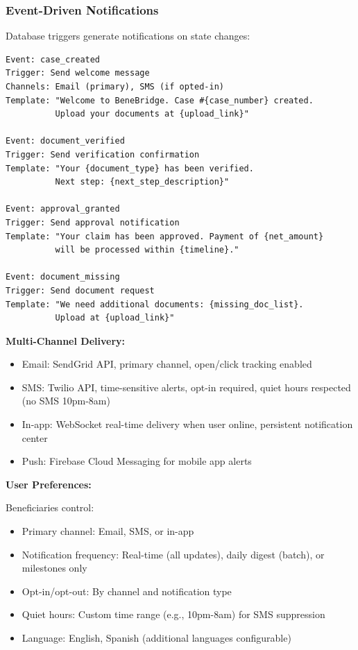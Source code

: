 \subsubsection{Event-Driven Notifications}

Database triggers generate notifications on state changes:

\begin{verbatim}
Event: case_created
Trigger: Send welcome message
Channels: Email (primary), SMS (if opted-in)
Template: "Welcome to BeneBridge. Case #{case_number} created.
          Upload your documents at {upload_link}"

Event: document_verified
Trigger: Send verification confirmation
Template: "Your {document_type} has been verified.
          Next step: {next_step_description}"

Event: approval_granted
Trigger: Send approval notification
Template: "Your claim has been approved. Payment of {net_amount}
          will be processed within {timeline}."

Event: document_missing
Trigger: Send document request
Template: "We need additional documents: {missing_doc_list}.
          Upload at {upload_link}"
\end{verbatim}

\textbf{Multi-Channel Delivery:}
\begin{itemize}
\item Email: SendGrid API, primary channel, open/click tracking enabled
\item SMS: Twilio API, time-sensitive alerts, opt-in required, quiet hours respected (no SMS 10pm-8am)
\item In-app: WebSocket real-time delivery when user online, persistent notification center
\item Push: Firebase Cloud Messaging for mobile app alerts
\end{itemize}

\textbf{User Preferences:}

Beneficiaries control:
\begin{itemize}
\item Primary channel: Email, SMS, or in-app
\item Notification frequency: Real-time (all updates), daily digest (batch), or milestones only
\item Opt-in/opt-out: By channel and notification type
\item Quiet hours: Custom time range (e.g., 10pm-8am) for SMS suppression
\item Language: English, Spanish (additional languages configurable)
\end{itemize}

